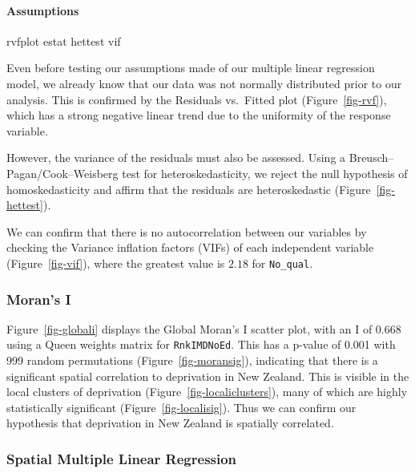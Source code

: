 \documentclass[
  letterpaper,
  DIV=11,
  numbers=noendperiod,
  oneside]{scrartcl}
\let\oldparagraph\paragraph
\renewcommand{\paragraph}[1]{\oldparagraph{#1}\mbox{}}
\newenvironment{Shaded}{\begin{snugshade}}{\end{snugshade}}
\newcommand{\KeywordTok}[1]{\textcolor[rgb]{0.00,0.23,0.31}{#1}}
\begin{document}
\hypertarget{assumptions}{%
\paragraph{Assumptions}\label{assumptions}}

\begin{Shaded}
\begin{Highlighting}[]
\KeywordTok{rvfplot}
\KeywordTok{estat} \KeywordTok{hettest}
\KeywordTok{vif}
\end{Highlighting}
\end{Shaded}

Even before testing our assumptions made of our multiple linear
regression model, we already know that our data was not normally
distributed prior to our analysis. This is confirmed by the Residuals
vs.~Fitted plot (Figure~\ref{fig-rvf}), which has a strong negative
linear trend due to the uniformity of the response variable.

However, the variance of the residuals must also be assessed. Using a
Breusch--Pagan/Cook--Weisberg test for heteroskedasticity, we reject the
null hypothesis of homoskedasticity and affirm that the residuals are
heteroskedastic (Figure~\ref{fig-hettest}).

We can confirm that there is no autocorrelation between our variables by
checking the Variance inflation factors (VIFs) of each independent
variable (Figure~\ref{fig-vif}), where the greatest value is \(2.18\)
for \texttt{No\_qual}.

\hypertarget{morans-i-1}{%
\subsubsection{Moran's I}\label{morans-i-1}}

Figure~\ref{fig-globali} displays the Global Moran's I scatter plot,
with an I of \(0.668\) using a Queen weights matrix for
\texttt{RnkIMDNoEd}. This has a p-value of 0.001 with 999 random
permutations (Figure~\ref{fig-moransig}), indicating that there is a
significant spatial correlation to deprivation in New Zealand. This is
visible in the local clusters of deprivation
(Figure~\ref{fig-localiclusters}), many of which are highly
statistically significant (Figure~\ref{fig-localisig}). Thus we can
confirm our hypothesis that deprivation in New Zealand is spatially
correlated.

\hypertarget{spatial-multiple-linear-regression-1}{%
\subsubsection{Spatial Multiple Linear
Regression}\label{spatial-multiple-linear-regression-1}}
\end{document}
